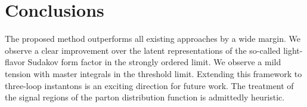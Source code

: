 \section{Conclusions}\label{sec:conclusions}

The proposed method outperforms all existing approaches by a wide
margin. We observe a clear improvement over the latent representations
of the so-called light-flavor Sudakov form factor in the strongly
ordered limit. We observe a mild tension with master integrals in the
threshold limit. Extending this framework to three-loop instantons is an
exciting direction for future work. The treatment of the signal regions
of the parton distribution function is admittedly heuristic.

